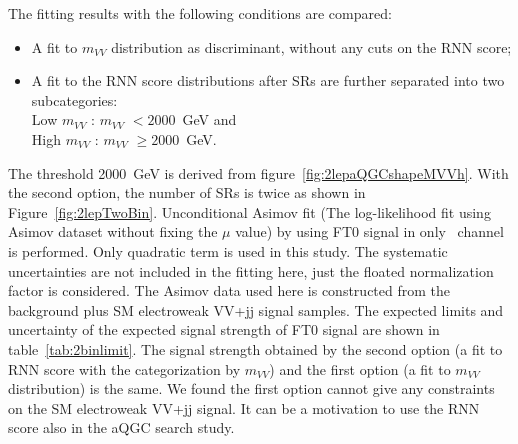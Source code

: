 The fitting results with the following conditions are compared:
\begin{itemize}
  \item A fit to $m_{VV}$ distribution as discriminant, without any cuts on the RNN score;
  \item A fit to the RNN score distributions after
        SRs are further separated into two subcategories: \\
        Low $m_{VV}$ : $m_{VV}$ $< 2000$~GeV and \\
        High $m_{VV}$ : $m_{VV}$ $\geq 2000$~GeV. \\
\end{itemize}
The threshold 2000~GeV is derived from figure~\ref{fig:2lepaQGCshapeMVVh}.
With the second option, the number of SRs is twice as shown in Figure~\ref{fig:2lepTwoBin}.
Unconditional Asimov fit (The log-likelihood fit using Asimov dataset without fixing the $\mu$ value) by using FT0 signal in only \tlep\ channel is performed.
Only quadratic term is used in this study.
The systematic uncertainties are not included in the fitting here, just the floated normalization factor is considered.
The Asimov data used here is constructed from the background plus SM electroweak VV+jj signal samples.
The expected limits and uncertainty of the expected signal strength of FT0 signal are shown in table~\ref{tab:2binlimit}.
The signal strength obtained by the second option (a fit to RNN score with the categorization by $m_{VV}$) and the first option (a fit to $m_{VV}$ distribution) is the same. 
We found the first option cannot give any constraints on the SM electroweak VV+jj signal.
It can be a motivation to use the RNN score also in the aQGC search study.


